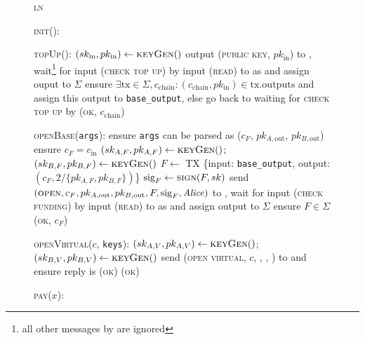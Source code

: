 \begin{figure}[H]
  \begin{processbox}{\textsc{ln}}
    \begin{algorithmic}[1]
      \State \textsc{init}():
      \Indent
        \State \TODO{}
      \EndIndent
      \Statex

      \State \textsc{topUp}(\alice):
      \Indent
        \State $(sk_{\mathrm{in}}, pk_{\mathrm{in}}) \gets \textsc{keyGen}()$
        \State output (\textsc{public key}, $pk_{\mathrm{in}}$) to \alice,
        wait\footnote{all other messages by \alice are ignored} for input
        (\textsc{check top up}) by \alice
        \State input (\textsc{read}) to \ledger as \alice and assign ouput to
        $\Sigma$
        \State ensure $\exists \mathrm{tx} \in \Sigma, c_{\mathrm{chain}}:
        (c_{\mathrm{chain}}, pk_{\mathrm{in}}) \in \mathrm{tx.outputs}$ and
        assign this output to \texttt{base\_output}, else go back to waiting for
        \textsc{check top up} by \alice
        \State \Return (\textsc{ok}, $c_{\mathrm{chain}}$)
      \EndIndent
      \Statex

      \State \textsc{openBase}(\texttt{args}):
      \Indent
        \State ensure \texttt{args} can be parsed as ($c_F$, $pk_{A,
        \mathrm{out}}$, $pk_{B, \mathrm{out}}$)
        \State ensure $c_F = c_{\mathrm{in}}$
        \State $(sk_{A, F}, pk_{A, F}) \gets \textsc{keyGen}()$; $(sk_{B, F},
        pk_{B, F}) \gets \textsc{keyGen}()$
        \State $F \gets$ TX \{input: \texttt{base\_output}, output: $(c_F,
        2/\{pk_{A, F}, pk_{B, F}\})$\}
        \State $\mathrm{sig}_F \gets \textsc{sign}(F, sk)$
        \State send $(\textsc{open}, c_F, pk_{A, \mathrm{out}}, pk_{B,
        \mathrm{out}}, F, \mathrm{sig}_F, \mathit{Alice})$ to \adversary, wait for
        input (\textsc{check funding}) by \alice
        \State input (\textsc{read}) to \ledger as \alice and assign output to
        $\Sigma$
        \State ensure $F \in \Sigma$
        \State \Return (\textsc{ok}, $c_F$)
      \EndIndent
      \Statex

      \State \textsc{openVirtual}($c$, \texttt{keys}):
      \Indent
        \State $(sk_{A, V}, pk_{A, V}) \gets \textsc{keyGen}()$; $(sk_{B, V},
        pk_{B, V}) \gets \textsc{keyGen}()$
        \State {}
        \State send (\textsc{open virtual}, $c$, \bob, \charlie, \alice) to
        \adversary and ensure reply is \textsc{(ok)}
        \State \Return (\textsc{ok})
      \EndIndent
      \Statex

      \State \textsc{pay}($x$):
      \Indent
        \State \TODO{}
      \EndIndent
      \Statex


\end{algorithmic}
\end{processbox}
\end{figure}
